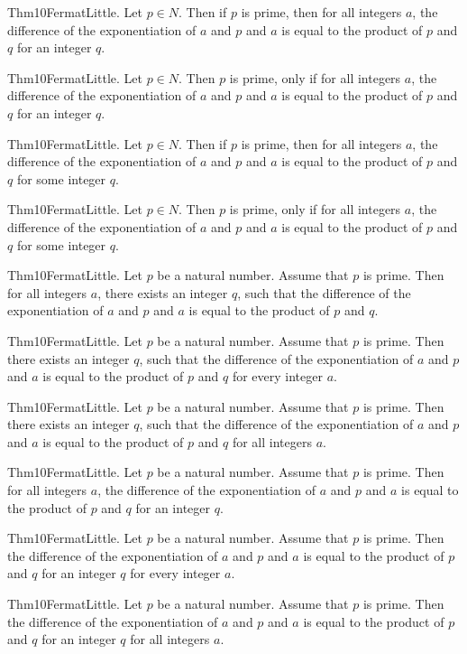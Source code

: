 \documentclass{article}
\begin{document}
Thm10FermatLittle. Let $p \in N$. Then if $p$ is prime, then for all integers $a$, the difference of the exponentiation of $a$ and $p$ and $a$ is equal to the product of $p$ and $q$ for an integer $q$.

Thm10FermatLittle. Let $p \in N$. Then $p$ is prime, only if for all integers $a$, the difference of the exponentiation of $a$ and $p$ and $a$ is equal to the product of $p$ and $q$ for an integer $q$.

Thm10FermatLittle. Let $p \in N$. Then if $p$ is prime, then for all integers $a$, the difference of the exponentiation of $a$ and $p$ and $a$ is equal to the product of $p$ and $q$ for some integer $q$.

Thm10FermatLittle. Let $p \in N$. Then $p$ is prime, only if for all integers $a$, the difference of the exponentiation of $a$ and $p$ and $a$ is equal to the product of $p$ and $q$ for some integer $q$.

Thm10FermatLittle. Let $p$ be a natural number. Assume that $p$ is prime. Then for all integers $a$, there exists an integer $q$, such that the difference of the exponentiation of $a$ and $p$ and $a$ is equal to the product of $p$ and $q$.

Thm10FermatLittle. Let $p$ be a natural number. Assume that $p$ is prime. Then there exists an integer $q$, such that the difference of the exponentiation of $a$ and $p$ and $a$ is equal to the product of $p$ and $q$ for every integer $a$.

Thm10FermatLittle. Let $p$ be a natural number. Assume that $p$ is prime. Then there exists an integer $q$, such that the difference of the exponentiation of $a$ and $p$ and $a$ is equal to the product of $p$ and $q$ for all integers $a$.

Thm10FermatLittle. Let $p$ be a natural number. Assume that $p$ is prime. Then for all integers $a$, the difference of the exponentiation of $a$ and $p$ and $a$ is equal to the product of $p$ and $q$ for an integer $q$.

Thm10FermatLittle. Let $p$ be a natural number. Assume that $p$ is prime. Then the difference of the exponentiation of $a$ and $p$ and $a$ is equal to the product of $p$ and $q$ for an integer $q$ for every integer $a$.

Thm10FermatLittle. Let $p$ be a natural number. Assume that $p$ is prime. Then the difference of the exponentiation of $a$ and $p$ and $a$ is equal to the product of $p$ and $q$ for an integer $q$ for all integers $a$.
\end{document}
